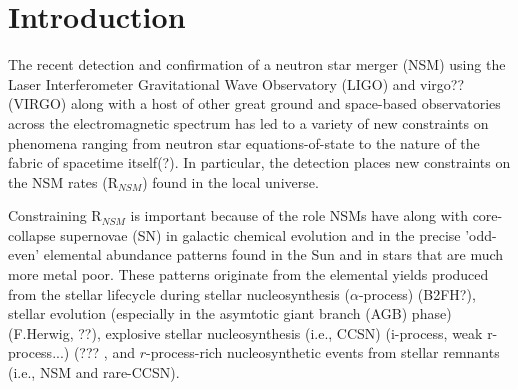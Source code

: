 \section{Introduction}
\label{intro} 
The recent detection and confirmation of a neutron star merger (NSM) using the Laser Interferometer Gravitational Wave Observatory (LIGO) and virgo?? (VIRGO) along with a host of other great ground and space-based observatories across the electromagnetic spectrum has led to a variety of new constraints on phenomena ranging from neutron star equations-of-state to the nature of the fabric of spacetime itself(?). In particular, the detection places new constraints on the NSM rates (R$_{NSM}$) found in the local universe. 

Constraining R$_{NSM}$ is important because of the role NSMs have along with core-collapse supernovae (SN) in galactic chemical evolution and in the precise 'odd-even' elemental abundance patterns found in the Sun and in stars that are much more metal poor. These patterns originate from the elemental yields produced from the stellar lifecycle during stellar nucleosynthesis ($\alpha$-process) (B2FH?), stellar evolution (especially in the asymtotic giant branch (AGB) phase)(F.Herwig, ??), explosive stellar nucleosynthesis (i.e., CCSN) (i-process, weak r-process...) (??? , and $r$-process-rich nucleosynthetic events from stellar remnants (i.e., NSM and rare-CCSN). 

